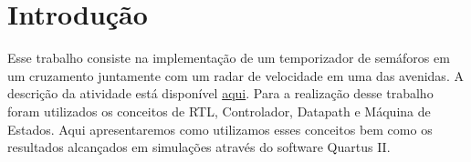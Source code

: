 \section{Introdução}
\setlength{\parindent}{2cm}

Esse trabalho consiste na implementação de um temporizador de semáforos em um cruzamento juntamente com um radar de velocidade em uma das avenidas. A descrição da atividade está disponível \href{https://github.com/kenreurisondca/Poster-Circuitos-Digitais}{aqui}. Para a realização desse trabalho foram utilizados os conceitos de RTL, Controlador, Datapath e Máquina de Estados. Aqui apresentaremos como utilizamos esses conceitos bem como os resultados alcançados em simulações através do software Quartus II.